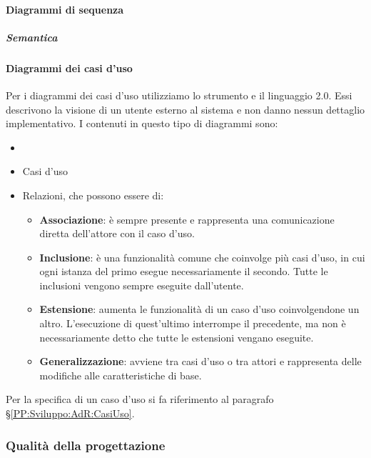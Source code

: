 		\paragraph{Diagrammi di sequenza}\label{PP:Sviluppo:DiagrammiSequenza} %

		\subparagraph{Semantica} %


		\paragraph{Diagrammi dei casi d'uso}\label{PP:Sviluppo:DiagrammiCasiUso}
		Per i diagrammi dei casi d'uso utilizziamo lo strumento  e il linguaggio  2.0. Essi descrivono la visione di un utente
		esterno al sistema e non danno nessun dettaglio implementativo. I  contenuti in questo tipo di diagrammi sono:
		\begin{itemize}
			\item {}
			\item Casi d'uso
			\item Relazioni, che possono essere di:
			\begin{itemize}
				\item \textbf{Associazione}: è sempre presente e rappresenta una comunicazione diretta dell'attore con il caso d'uso.
				\item \textbf{Inclusione}: è una funzionalità comune che coinvolge più casi d'uso, in cui ogni istanza del primo esegue
					necessariamente il secondo. Tutte le inclusioni vengono sempre eseguite dall'utente.
				\item \textbf{Estensione}: aumenta le funzionalità di un caso d'uso coinvolgendone un altro. L'esecuzione di quest'ultimo interrompe il precedente, ma non è necessariamente detto che tutte le estensioni vengano eseguite.
				\item \textbf{Generalizzazione}: avviene tra casi d'uso o tra attori e rappresenta delle modifiche alle caratteristiche di base.
			\end{itemize}
		\end{itemize}
		Per la specifica di un caso d'uso si fa riferimento al paragrafo \S\ref{PP:Sviluppo:AdR:CasiUso}.


		\subsubsection{Qualità della progettazione}\label{PP:Sviluppo:QualitàProgettazione} %

